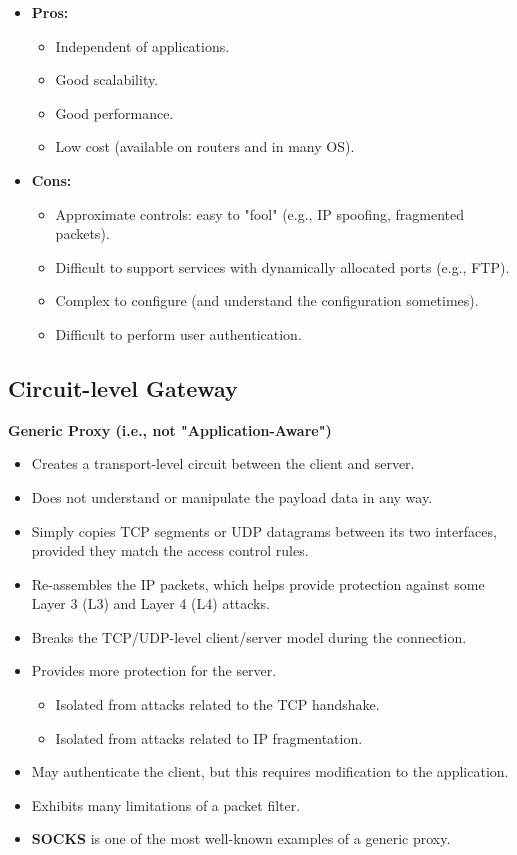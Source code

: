 \begin{itemize}
    \item \textbf{Pros:}
    \begin{itemize}
        \item Independent of applications.
        \item Good scalability.
        \item Good performance.
        \item Low cost (available on routers and in many OS).
    \end{itemize}
    \item \textbf{Cons:}
    \begin{itemize}
        \item Approximate controls: easy to "fool" (e.g., IP spoofing, fragmented packets).
        \item Difficult to support services with dynamically allocated ports (e.g., FTP).
        \item Complex to configure (and understand the configuration sometimes).
        \item Difficult to perform user authentication.
    \end{itemize}
\end{itemize}

\subsection{Circuit-level Gateway}
\textbf{Generic Proxy (i.e., not "Application-Aware")}
\begin{itemize}
    \item Creates a transport-level circuit between the client and server.
    \item Does not understand or manipulate the payload data in any way.
    \item Simply copies TCP segments or UDP datagrams between its two interfaces, provided they match the access control rules.
    \item Re-assembles the IP packets, which helps provide protection against some Layer 3 (L3) and Layer 4 (L4) attacks.
    \item Breaks the TCP/UDP-level client/server model during the connection.
    \item Provides more protection for the server.
    \begin{itemize}
        \item Isolated from attacks related to the TCP handshake.
        \item Isolated from attacks related to IP fragmentation.
    \end{itemize} 
    \item May authenticate the client, but this requires modification to the application.
    \item Exhibits many limitations of a packet filter.
    \item \textbf{SOCKS} is one of the most well-known examples of a generic proxy.
\end{itemize}

